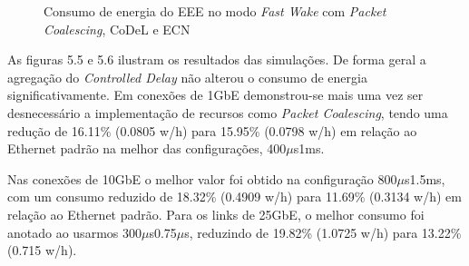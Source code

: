 \begin{figure}[!htb]
    \centering
    \label{fig:EEEFastWakePaCoCoDelECN}
    
    \hfill
    
    \caption{\centering Consumo de energia do EEE no modo \emph{Fast Wake} com \emph{Packet Coalescing}, CoDeL e ECN}
\end{figure}

As figuras 5.5 e 5.6 ilustram os resultados das simulações. De forma geral a agregação do \emph{Controlled Delay} não alterou o consumo de energia significativamente. Em conexões de 1GbE demonstrou-se mais uma vez ser desnecessário a implementação de recursos como \emph{Packet Coalescing}, tendo uma redução de 16.11\% (0.0805 w/h) para 15.95\% (0.0798 w/h) em relação ao Ethernet padrão na melhor das configurações, 400$\mu$s1ms.

Nas conexões de 10GbE o melhor valor foi obtido na configuração 800$\mu$s1.5ms, com um consumo reduzido de 18.32\% (0.4909 w/h) para 11.69\% (0.3134 w/h) em relação ao Ethernet padrão. Para os links de 25GbE, o melhor consumo foi anotado ao usarmos 300$\mu$s0.75$\mu$s, reduzindo de 19.82\% (1.0725 w/h) para 13.22\% (0.715 w/h).

